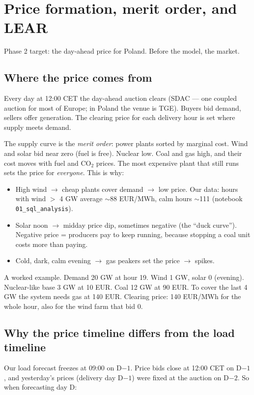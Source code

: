\section{Price formation, merit order, and LEAR}

Phase 2 target: the day-ahead price for Poland. Before the model, the market.

\subsection{Where the price comes from}

Every day at 12:00 CET the day-ahead auction clears (SDAC --- one coupled
auction for most of Europe; in Poland the venue is TGE). Buyers bid demand,
sellers offer generation. The clearing price for each delivery hour is set
where supply meets demand.

The supply curve is the \emph{merit order}: power plants sorted by marginal
cost. Wind and solar bid near zero (fuel is free). Nuclear low. Coal and gas
high, and their cost moves with fuel and CO$_2$ prices. The most expensive
plant that still runs sets the price for \emph{everyone}. This is why:

\begin{itemize}
  \item High wind $\to$ cheap plants cover demand $\to$ low price.
        Our data: hours with wind $>$ 4 GW average $\sim$88 EUR/MWh,
        calm hours $\sim$111 (notebook \texttt{01\_sql\_analysis}).
  \item Solar noon $\to$ midday price dip, sometimes negative
        (the ``duck curve''). Negative price = producers pay to keep
        running, because stopping a coal unit costs more than paying.
  \item Cold, dark, calm evening $\to$ gas peakers set the price $\to$ spikes.
\end{itemize}

A worked example. Demand 20 GW at hour 19. Wind 1 GW, solar 0 (evening).
Nuclear-like base 3 GW at 10 EUR. Coal 12 GW at 90 EUR. To cover the last
4 GW the system needs gas at 140 EUR. Clearing price: 140 EUR/MWh for the
whole hour, also for the wind farm that bid 0.

\subsection{Why the price timeline differs from the load timeline}

Our load forecast freezes at 09:00 on D$-1$. Price bids close at 12:00 CET
on D$-1$, and yesterday's prices (delivery day D$-1$) were fixed at the
auction on D$-2$. So when forecasting day D:

